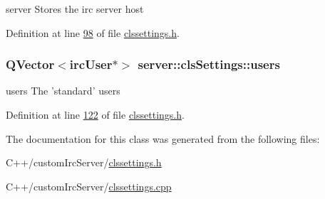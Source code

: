 server Stores the irc server host 



Definition at line \hyperlink{custom_irc_server_2clssettings_8h_source_l00098}{98} of file \hyperlink{custom_irc_server_2clssettings_8h_source}{clssettings.\-h}.

\hypertarget{classserver_1_1cls_settings_a089480b066c0a095426261cd3219506d}{
\subsubsection[{users}]{\setlength{\rightskip}{0pt plus 5cm}Q\-Vector$<${\bf irc\-User}$\ast$$>$ server\-::cls\-Settings\-::users\hspace{0.3cm}{\ttfamily [private]}}}\label{d7/d81/classserver_1_1cls_settings_a089480b066c0a095426261cd3219506d}


users The 'standard' users 



Definition at line \hyperlink{custom_irc_server_2clssettings_8h_source_l00122}{122} of file \hyperlink{custom_irc_server_2clssettings_8h_source}{clssettings.\-h}.



The documentation for this class was generated from the following files\-:\begin{DoxyCompactItemize}
\item 
C++/custom\-Irc\-Server/\hyperlink{custom_irc_server_2clssettings_8h}{clssettings.\-h}\item 
C++/custom\-Irc\-Server/\hyperlink{custom_irc_server_2clssettings_8cpp}{clssettings.\-cpp}\end{DoxyCompactItemize}
